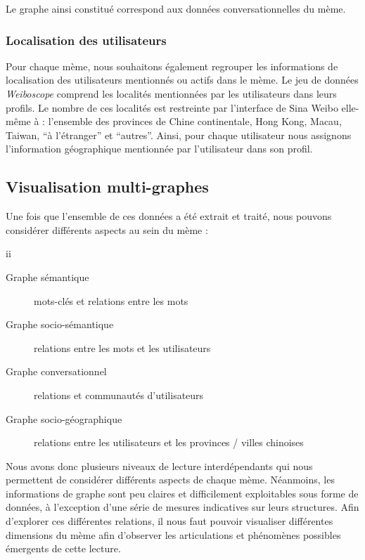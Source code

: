 Le graphe ainsi constitué correspond aux données conversationnelles
du mème.

\subsubsection{Localisation des utilisateurs}

Pour chaque mème, nous souhaitons également regrouper les
informations de localisation des utilisateurs mentionnés ou actifs
dans le mème. Le jeu de données \textit{Weiboscope }comprend les
localités mentionnées par les utilisateurs dans leurs profils. Le
nombre de ces localités est restreinte par
l{\textquoteright}interface de Sina Weibo elle-m\^eme à :
l{\textquoteright}ensemble des provinces de Chine continentale, Hong
Kong, Macau, Taiwan, {\textquotedblleft}à
l{\textquoteright}étranger{\textquotedblright} et
{\textquotedblleft}autres{\textquotedblright}. Ainsi, pour chaque
utilisateur nous assignons l{\textquoteright}information géographique
mentionnée par l{\textquoteright}utilisateur dans son profil.

\subsection{Visualisation multi-graphes}
Une fois que l{\textquoteright}ensemble de ces données a été
extrait et traité, nous pouvons considérer différents aspects au
sein du mème :

ii
\begin{description}
\item[Graphe sémantique] mots-clés et relations entre les mots
\item[Graphe socio-sémantique] relations entre les mots et les
utilisateurs
\item[Graphe conversationnel] relations et communautés
d{\textquoteright}utilisateurs 
\item[Graphe socio-géographique] relations entre les utilisateurs et
les provinces / villes chinoises
\end{description}

Nous avons donc plusieurs niveaux de lecture interdépendants qui nous
permettent de considérer différents aspects de chaque mème.
Néanmoins, les informations de graphe sont peu claires et
difficilement exploitables sous forme de données, à
l{\textquoteright}exception d{\textquoteright}une série de mesures
indicatives sur leurs structures. Afin d{\textquoteright}explorer ces
différentes relations, il nous faut pouvoir visualiser différentes
dimensions du mème afin d{\textquoteright}observer les articulations
et phénomènes possibles émergents de cette lecture. 

